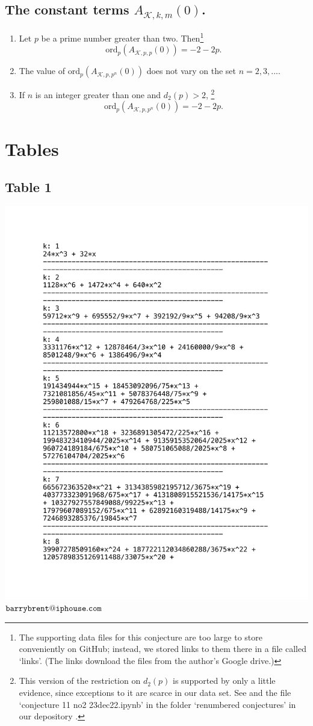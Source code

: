 \documentclass{article}
\begin{document}
\subsection[]{The constant terms $A_{\mathcal{K},k,m}(0)$.
} 
\begin{conjecture}
\begin{enumerate}
\item
 Let $p$ be a prime number greater than two.
Then\footnote{The supporting data files
for this conjecture are too large to store
conveniently on GitHub; instead, we stored
links to them there in a file
called `links'.\cite{githubNewmanShanks} (The links download the files from the author's Google 
drive.)}
$$\text{ord}_p(A_{\mathcal{K},p,p}(0)) = 
-2 - 2p.$$
\item The value of $\text{ord}_p(A_{\mathcal{K},p,p^n}(0))$
does not vary on the set $n = 2, 3, ...$.
\item  If $n$ is an integer greater than one
and $d_2(p)>2$, 
\footnote{This version of the
restriction on
$d_2(p)$ is supported by only a little evidence, since exceptions to it
are scarce in our data set.
See \cite{OEIScoveiro} and
the file `conjecture 11 no2 23dec22.ipynb'
in the folder `renumbered conjectures'
in our depository
\cite{githubNewmanShanks}.}
$$\text{ord}_p(A_{\mathcal{K},p,p^n}(0)) = 
-2 - 2p.$$
\end{enumerate}
\end{conjecture}
\newpage
\section{Tables}
\subsection[]{Table 1}
\includegraphics[scale=.5]{hkbu.pdf}
\printbibliography
$\tt{barrybrent@iphouse.com}$
\end{document}
